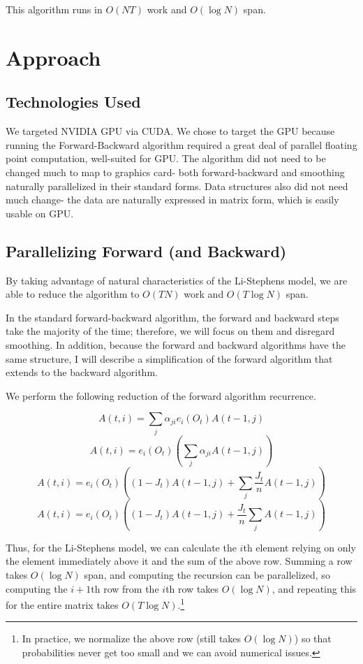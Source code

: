 \documentclass[12pt]{article}
\begin{document}
This algorithm runs in $O(NT)$ work and $O(\log N)$ span.  

\section{Approach}

\subsection{Technologies Used}

We targeted NVIDIA GPU via CUDA.  We chose to target the GPU because running the Forward-Backward algorithm required a great deal of parallel floating point computation, well-suited for GPU.  The algorithm did not need to be changed much to map to graphics card- both forward-backward and smoothing naturally parallelized in their standard forms.  Data structures also did not need much change- the data are naturally expressed in matrix form, which is easily usable on GPU.

\subsection{Parallelizing Forward (and Backward)}

By taking advantage of natural characteristics of the Li-Stephens model, we are able to reduce the algorithm to $O(TN)$ work and $O(T\log N)$ span.

In the standard forward-backward algorithm, the forward and backward steps take the majority of the time; therefore, we will focus on them and disregard smoothing.  In addition, because the forward and backward algorithms have the same structure, I will describe a simplification of the forward algorithm that extends to the backward algorithm.

We perform the following reduction of the forward algorithm recurrence.

$$ A(t, i) = \sum_j \alpha_{ji} e_i(O_t) A(t-1, j) $$
$$ A(t, i) = e_i(O_t) (\sum_j \alpha_{ji}  A(t-1, j)) $$
$$ A(t, i) = e_i(O_t) ((1-J_t)A(t-1, j) + \sum_j \frac{J_t}{n} A(t-1, j)) $$
$$ A(t, i) = e_i(O_t) ((1-J_t)A(t-1, j) + \frac{J_t}{n}\sum_j A(t-1, j)) $$

Thus, for the Li-Stephens model, we can calculate the $i$th element relying on only the element immediately above it and the sum of the above row.  Summing a row takes $O(\log N)$ span, and computing the recursion can be parallelized, so computing the $i+1$th row from the $i$th row takes $O(\log N)$, and repeating this for the entire matrix takes $O(T\log N)$.\footnote{In practice, we normalize the above row (still takes $O(\log N)$) so that probabilities never get too small and we can avoid numerical issues.}
\end{document}
